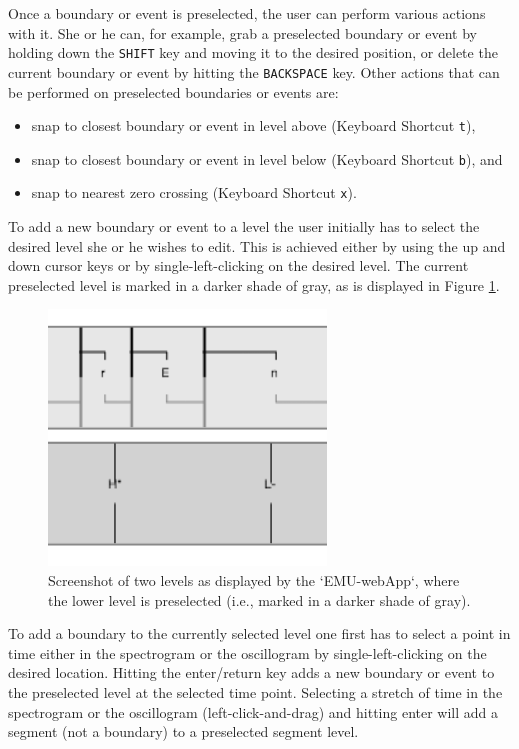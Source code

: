 \documentclass[]{book}
\providecommand{\tightlist}{%
  \setlength{\itemsep}{0pt}\setlength{\parskip}{0pt}}
\theoremstyle{definition}
\theoremstyle{definition}
\theoremstyle{definition}
\theoremstyle{remark}
\begin{document}
Once a boundary or event is preselected, the user can perform various
actions with it. She or he can, for example, grab a preselected boundary
or event by holding down the \texttt{SHIFT} key and moving it to the
desired position, or delete the current boundary or event by hitting the
\texttt{BACKSPACE} key. Other actions that can be performed on
preselected boundaries or events are:

\begin{itemize}
\tightlist
\item
  snap to closest boundary or event in level above (Keyboard Shortcut
  \texttt{t}),
\item
  snap to closest boundary or event in level below (Keyboard Shortcut
  \texttt{b}), and
\item
  snap to nearest zero crossing (Keyboard Shortcut \texttt{x}).
\end{itemize}

To add a new boundary or event to a level the user initially has to
select the desired level she or he wishes to edit. This is achieved
either by using the up and down cursor keys or by single-left-clicking
on the desired level. The current preselected level is marked in a
darker shade of gray, as is displayed in Figure
\ref{fig:webApp-selectLevel}.

\begin{figure}

{\centering \includegraphics[width=0.4\linewidth]{pics/selectLevel} 

}

\caption{Screenshot of two levels as displayed by the `EMU-webApp`, where the lower level is preselected (i.e., marked in a darker shade of gray).}\label{fig:webApp-selectLevel}
\end{figure}

To add a boundary to the currently selected level one first has to
select a point in time either in the spectrogram or the oscillogram by
single-left-clicking on the desired location. Hitting the enter/return
key adds a new boundary or event to the preselected level at the
selected time point. Selecting a stretch of time in the spectrogram or
the oscillogram (left-click-and-drag) and hitting enter will add a
segment (not a boundary) to a preselected segment level.
\end{document}
